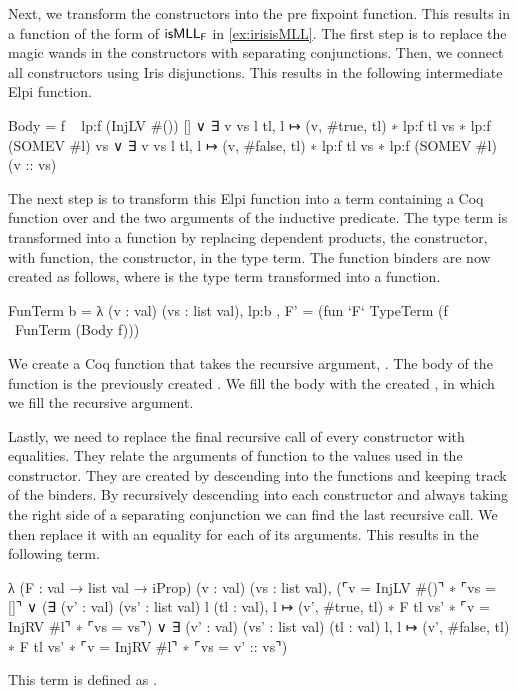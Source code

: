\documentclass[thesis.tex]{subfiles}
\begin{document}
Next, we transform the constructors into the pre fixpoint function. This results in a function of the form of $\textsf{\upshape isMLL}_{\textsf{\upshape F}}$ in \cref{ex:irisisMLL}.
The first step is to replace the magic wands in the constructors with separating conjunctions. Then, we connect all constructors using Iris disjunctions. This results in the following intermediate Elpi function.
\begin{elpicode}
  Body = f \ {{
      lp:f (InjLV #()) []
    ∨ ∃ v vs l tl, l ↦ (v, #true, tl) ∗ lp:f tl vs ∗ 
                     lp:f (SOMEV #l) vs
    ∨ ∃ v vs l tl, l ↦ (v, #false, tl) ∗ lp:f tl vs ∗ 
                   lp:f (SOMEV #l) (v :: vs)
  }}
\end{elpicode}
The next step is to transform this Elpi function into a term containing a Coq function over  and the two arguments of the inductive predicate. The type term is transformed into a function by replacing dependent products, the  constructor, with function, the  constructor, in the type term. The function binders are now created as follows, where  is the type term transformed into a function.
\begin{elpicode}
  FunTerm b = {{ λ (v : val) (vs : list val), lp:b }},
  F' = (fun `F` TypeTerm (f \ FunTerm (Body f)))
\end{elpicode}
We create a Coq function that takes the recursive argument, . The body of the function is the previously created . We fill the body with the created , in which we fill the recursive argument.

Lastly, we need to replace the final recursive call of every constructor with equalities. They relate the arguments of function to the values used in the constructor. They are created by descending into the functions and keeping track of the binders. By recursively descending into each constructor and always taking the right side of a separating conjunction we can find the last recursive call. We then replace it with an equality for each of its arguments. This results in the following term.
\begin{coqcode}
  λ (F : val → list val → iProp) (v : val) (vs : list val),
    (⌜v = InjLV #()⌝ ∗ ⌜vs = []⌝
      ∨ (∃ (v' : val) (vs' : list val) l (tl : val), 
            l ↦ (v', #true, tl) ∗ F tl vs' ∗ 
            ⌜v = InjRV #l⌝ ∗ ⌜vs = vs⌝)
      ∨ ∃ (v' : val) (vs' : list val) (tl : val) l, 
            l ↦ (v', #false, tl) ∗ F tl vs' ∗ 
            ⌜v = InjRV #l⌝ ∗ ⌜vs = v' :: vs⌝)
\end{coqcode}
This term is defined as .
\end{document}
